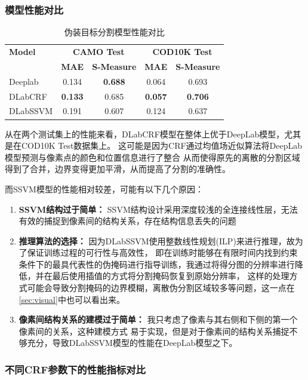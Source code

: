 \documentclass[a4paper,12pt]{ctexart}
\begin{document}
\subsubsection{模型性能对比}

\begin{table}[h!]
    \centering
    \begin{tabular}{|l|c|c|c|c|}
    \hline
    \textbf{Model} & \multicolumn{2}{c|}{\textbf{CAMO Test}} & \multicolumn{2}{c|}{\textbf{COD10K Test}} \\
    \cline{2-5}
     & \textbf{MAE} & \textbf{S-Measure} & \textbf{MAE} & \textbf{S-Measure} \\
    \hline
    Deeplab & 0.134 & \textbf{0.688} & 0.064 & 0.693 \\
    DLabCRF & \textbf{0.133} & 0.685 & \textbf{0.057} & \textbf{0.706} \\
    DLabSSVM & 0.191 & 0.607 & 0.124 & 0.637 \\
    \hline
    \end{tabular}
    \caption{伪装目标分割模型性能对比}
\end{table}

从在两个测试集上的性能来看，DLabCRF模型在整体上优于DeepLab模型，尤其是在COD10K Test数据集上。
这可能是因为CRF通过均值场近似算法将DeepLab模型预测与像素点的颜色和位置信息进行了整合
从而使得原先的离散的分割区域得到了合并，边界变得更加平滑，从而提高了分割的准确性。

而SSVM模型的性能相对较差，可能有以下几个原因：
\begin{enumerate}
    \item \textbf{SSVM结构过于简单：} SSVM结构设计采用深度较浅的全连接线性层，无法有效的捕捉到像素间的结构关系，存在结构信息丢失的问题
    \item \textbf{推理算法的选择：} 因为DLabSSVM使用整数线性规划(ILP)来进行推理，故为了保证训练过程的可行性与高效性，
    即在训练时能够在有限时间内找到约束条件下的最具代表性的伪掩码进行指导训练，我通过将得分图的分辨率进行降低，并在最后使用插值的方式将分割掩码恢复到原始分辨率，
    这样的处理方式可能会导致分割掩码的边界模糊，离散伪分割区域较多等问题，这一点在\ref{sec:visual}中也可以看出来。
    \item \textbf{像素间结构关系的建模过于简单：} 我只考虑了像素与其右侧和下侧的第一个像素间的关系，这种建模方式
    易于实现，但是对于像素间的结构关系捕捉不够充分，导致DLabSSVM模型的性能在DeepLab模型之下。
\end{enumerate}

\subsubsection{不同CRF参数下的性能指标对比}
\label{sec:crfparam}
\end{document}
